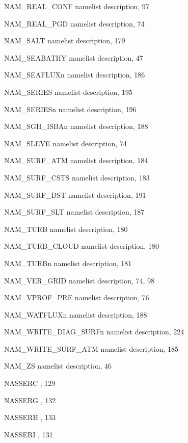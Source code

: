 \begin{theindex}
  \item NAM\_REAL\_CONF
    \subitem namelist description,  97
  \item NAM\_REAL\_PGD
    \subitem namelist description,  74
  \item NAM\_SALT
    \subitem namelist description,  179
  \item NAM\_SEABATHY
    \subitem namelist description,  47
  \item NAM\_SEAFLUXn
    \subitem namelist description,  186
  \item NAM\_SERIES
    \subitem namelist description,  195
  \item NAM\_SERIESn
    \subitem namelist description,  196
  \item NAM\_SGH\_ISBAn
    \subitem namelist description,  188
  \item NAM\_SLEVE
    \subitem namelist description,  74
  \item NAM\_SURF\_ATM
    \subitem namelist description,  184
  \item NAM\_SURF\_CSTS
    \subitem namelist description,  183
  \item NAM\_SURF\_DST
    \subitem namelist description,  191
  \item NAM\_SURF\_SLT
    \subitem namelist description,  187
  \item NAM\_TURB
    \subitem namelist description,  180
  \item NAM\_TURB\_CLOUD
    \subitem namelist description,  180
  \item NAM\_TURBn
    \subitem namelist description,  181
  \item NAM\_VER\_GRID
    \subitem namelist description,  74, 98
  \item NAM\_VPROF\_PRE
    \subitem namelist description,  76
  \item NAM\_WATFLUXn
    \subitem namelist description,  188
  \item NAM\_WRITE\_DIAG\_SURFn
    \subitem namelist description,  224
  \item NAM\_WRITE\_SURF\_ATM
    \subitem namelist description,  185
  \item NAM\_ZS
    \subitem namelist description,  46
  \item NASSERC
    \subitem {},  129
  \item NASSERG
    \subitem {},  132
  \item NASSERH
    \subitem {},  133
  \item NASSERI
    \subitem {},  131

\end{theindex}
